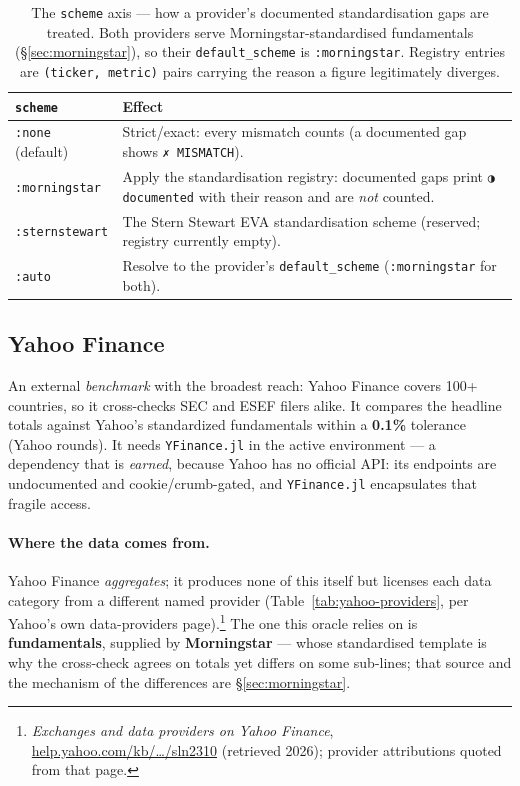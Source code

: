 \documentclass[11pt,a4paper]{report}
\newcommand{\statmark}[1]{{\symbolfont #1}}
\begin{document}
\begin{table}[h]
\centering\small
\caption{The \texttt{scheme} axis --- how a provider's documented standardisation gaps are treated. Both
providers serve Morningstar-standardised fundamentals (\S\ref{sec:morningstar}), so their \texttt{default\_scheme}
is \texttt{:morningstar}. Registry entries are \texttt{(ticker, metric)} pairs carrying the reason a figure
legitimately diverges.}
\label{tab:oracle-schemes}
\begin{tabular}{@{}ll@{}}
\toprule
\textbf{\texttt{scheme}} & \textbf{Effect} \\
\midrule
\texttt{:none} (default) & Strict/exact: every mismatch counts (a documented gap shows \texttt{\statmark{✗} MISMATCH}). \\
\texttt{:morningstar} & Apply the standardisation registry: documented gaps print \texttt{\statmark{◑} documented} with their reason and are \emph{not} counted. \\
\texttt{:sternstewart} & The Stern Stewart EVA standardisation scheme (reserved; registry currently empty). \\
\texttt{:auto} & Resolve to the provider's \texttt{default\_scheme} (\texttt{:morningstar} for both). \\
\bottomrule
\end{tabular}
\end{table}

\subsection{Yahoo Finance}\label{sec:yahoo-oracle}

An external \emph{benchmark} with the broadest reach: Yahoo Finance covers 100+ countries, so it cross-checks
SEC and ESEF filers alike. It compares the headline totals against Yahoo's standardized fundamentals within a
\textbf{0.1\%} tolerance (Yahoo rounds). It needs \texttt{YFinance.jl} in the active environment --- a
dependency that is \emph{earned}, because Yahoo has no official API: its endpoints are undocumented and
cookie/crumb-gated, and \texttt{YFinance.jl} encapsulates that fragile access.

\paragraph{Where the data comes from.} Yahoo Finance \emph{aggregates}; it produces none of this itself but
licenses each data category from a different named provider (Table~\ref{tab:yahoo-providers}, per Yahoo's own
data-providers page).\footnote{\emph{Exchanges and data providers on Yahoo Finance},
\href{https://help.yahoo.com/kb/finance-for-web/exchanges-data-providers-yahoo-finance-sln2310.html}%
{help.yahoo.com/kb/\ldots/sln2310} (retrieved 2026); provider attributions quoted from that page.} The one this
oracle relies on is \textbf{fundamentals}, supplied by \textbf{Morningstar} --- whose standardised template is
why the cross-check agrees on totals yet differs on some sub-lines; that source and the mechanism of the
differences are \S\ref{sec:morningstar}.
\end{document}
